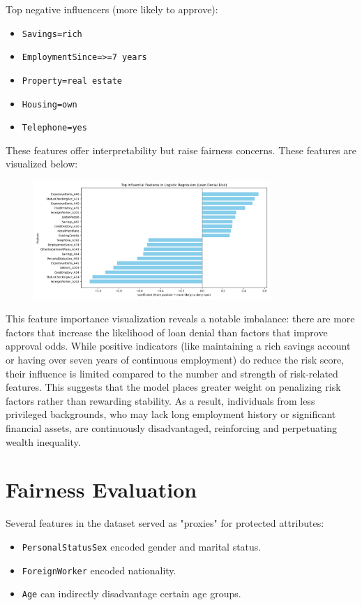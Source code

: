 \documentclass[12pt]{article}
\begin{document}
	Top negative influencers (more likely to approve):
	\begin{itemize}
		\item \texttt{Savings=rich}
		\item \texttt{EmploymentSince=\textgreater=7 years}
		\item \texttt{Property=real estate}
		\item \texttt{Housing=own}
		\item \texttt{Telephone=yes}
	\end{itemize}
	
	These features offer interpretability but raise fairness concerns. These features are visualized below:
	
	\begin{figure}[h]
		\centering
		\includegraphics[width=0.8\textwidth]{InfluentialFeatures.png}
		\label{fig:top_features}
	\end{figure}
	
	This feature importance visualization reveals a notable imbalance: there are more factors that increase the likelihood of loan denial than factors that improve approval odds. While positive indicators (like maintaining a rich savings account or having over seven years of continuous employment) do reduce the risk score, their influence is limited compared to the number and strength of risk-related features. This suggests that the model places greater weight on penalizing risk factors rather than rewarding stability. As a result, individuals from less privileged backgrounds, who may lack long employment history or significant financial assets, are continuously disadvantaged, reinforcing and perpetuating wealth inequality.
	
	\section{Fairness Evaluation}
	Several features in the dataset served as "proxies" for protected attributes:
	\begin{itemize}
		\item \texttt{PersonalStatusSex} encoded gender and marital status.
		\item \texttt{ForeignWorker} encoded nationality.
		\item \texttt{Age} can indirectly disadvantage certain age groups.
	\end{itemize}
	
\end{document}

